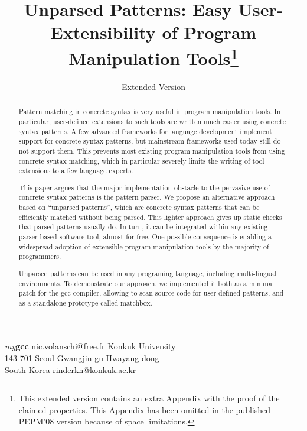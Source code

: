 \documentclass{sigplanconf}
\begin{document}


\title{Unparsed Patterns: Easy User-Extensibility of Program
Manipulation Tools\thanks{This extended version contains an extra
Appendix with the proof of the claimed properties. This Appendix has
been omitted in the published PEPM'08 version because of space
limitations.}}

\subtitle{Extended Version}

           {{\em my}{\bf gcc}}
           {nic.volanschi@free.fr}
           {Konkuk University \\ 
	     143-701 Seoul Gwangjin-gu Hwayang-dong \\
	     South Korea}
           {rinderkn@konkuk.ac.kr}

\maketitle

\begin{abstract}
Pattern matching in concrete syntax is very useful in program
manipulation tools. In particular, user-defined extensions to such
tools are written much easier using concrete syntax patterns. A few
advanced frameworks for language development implement support for
concrete syntax patterns, but mainstream frameworks used today still
do not support them. This prevents most existing program manipulation
tools from using concrete syntax matching, which in particular
severely limits the writing of tool extensions to a few language
experts.

This paper argues that the major implementation obstacle to the
pervasive use of concrete syntax patterns is the pattern parser. We
propose an alternative approach based on ``unparsed patterns'', which
are concrete syntax patterns that can be efficiently matched without
being parsed. This lighter approach gives up static checks that parsed
patterns usually do. In turn, it can be integrated within any existing
parser-based software tool, almost for free. One possible consequence
is enabling a widespread adoption of extensible program manipulation
tools by the majority of programmers.

Unparsed patterns can be used in any programing language, including
multi-lingual environments. To demonstrate our approach, we
implemented it both as a minimal patch for the gcc compiler, allowing
to scan source code for user-defined patterns, and as a standalone
prototype called matchbox.
\end{abstract}
\end{document}
